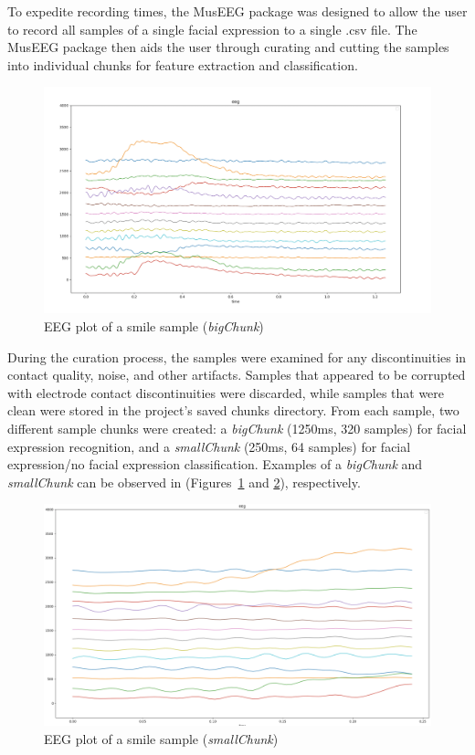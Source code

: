 To expedite recording times, the MusEEG package was designed to allow the user to record all samples of a single facial expression to a single .csv file. The MusEEG package then aids the user through curating and cutting the samples into individual chunks for feature extraction and classification. 

\begin{figure}[htbp]
	\centering
		\includegraphics[width=1\columnwidth]{smileBigChunk_320.png}
	\caption{EEG plot of a smile sample (\textit{bigChunk})}
	\label{fig:smileBigChunk}
\end{figure}

During the curation process, the samples were examined for any discontinuities in contact quality, noise, and other artifacts. Samples that appeared to be corrupted with electrode contact discontinuities were discarded, while samples that were clean were stored in the project’s saved chunks directory. From each sample, two different sample chunks were created: a \textit{bigChunk} (1250ms, 320 samples) for facial expression recognition, and a \textit{smallChunk} (250ms, 64 samples) for facial expression/no facial expression classification. Examples of a \textit{bigChunk} and \textit{smallChunk} can be observed in (Figures~\ref{fig:smileBigChunk} and \ref{fig:smileSmallChunk}), respectively.

\begin{figure}[htbp]
	\centering
		\includegraphics[width=1\columnwidth]{smileSmallChunk_64.png}
	\caption{EEG plot of a smile sample (\textit{smallChunk})}
	\label{fig:smileSmallChunk}
\end{figure}

